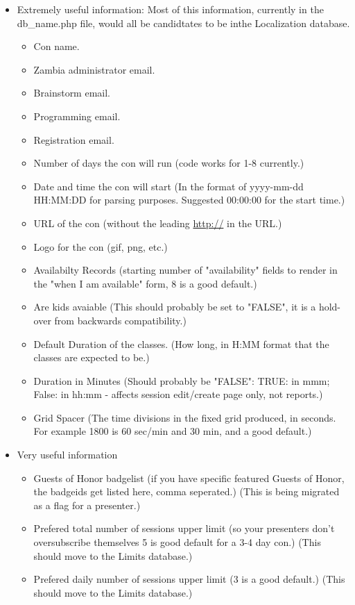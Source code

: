 \documentclass[captions=tablesignature]{scrartcl}
\begin{document}
\begin{itemize}
\item Extremely useful information:
\label{sec-1-2-4-2}
Most of this information, currently in the db\_name.php file,
would all be candidtates to be inthe Localization database.
\begin{itemize}
\item Con name.
\item Zambia administrator email.
\item Brainstorm email.
\item Programming email.
\item Registration email.
\item Number of days the con will run (code works for 1-8 currently.)
\item Date and time the con will start (In the format of yyyy-mm-dd
HH:MM:DD for parsing purposes.  Suggested 00:00:00 for the
start time.)
\item URL of the con (without the leading \url{http://} in the URL.)
\item Logo for the con (gif, png, etc.)
\item Availabilty Records (starting number of "availability" fields
to render in the "when I am available" form, 8 is a good
default.)
\item Are kids avaiable (This should probably be set to "FALSE", it
is a hold-over from backwards compatibility.)
\item Default Duration of the classes. (How long, in H:MM format that
the classes are expected to be.)
\item Duration in Minutes (Should probably be "FALSE": TRUE: in mmm;
False: in hh:mm - affects session edit/create page only, not
reports.)
\item Grid Spacer (The time divisions in the fixed grid produced, in
seconds.  For example 1800 is 60 sec/min and 30 min, and a good
default.)
\end{itemize}

\item Very useful information
\label{sec-1-2-4-3}
\begin{itemize}
\item Guests of Honor badgelist (if you have specific featured Guests
of Honor, the badgeids get listed here, comma seperated.)
(This is being migrated as a flag for a presenter.)
\item Prefered total number of sessions upper limit (so your
presenters don't oversubscribe themselves 5 is good default for
a 3-4 day con.) (This should move to the Limits database.)
\item Prefered daily number of sessions upper limit (3 is a good
default.) (This should move to the Limits database.)
\end{itemize}


\end{itemize}
\end{document}

